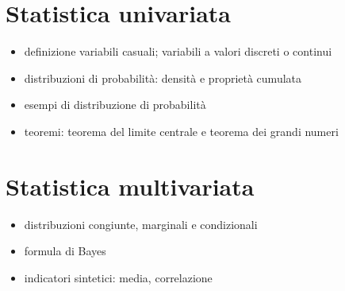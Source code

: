 
\section{Statistica univariata}
% 

\begin{itemize}
  \item definizione variabili casuali; variabili a valori discreti o continui
  \item distribuzioni di probabilità: densità e proprietà cumulata
  \item esempi di distribuzione di probabilità
  \item teoremi: teorema del limite centrale e teorema dei grandi numeri
\end{itemize}


\section{Statistica multivariata}
% 

\begin{itemize}
  \item distribuzioni congiunte, marginali e condizionali
  \item formula di Bayes
  \item indicatori sintetici: media, correlazione
\end{itemize}







